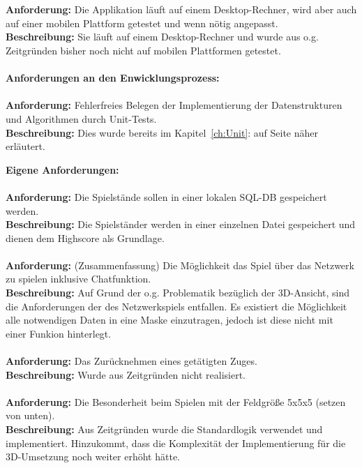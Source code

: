 \documentclass[a4paper]{scrartcl}
\begin{document}
\\
\\
\textbf{Anforderung:} Die Applikation läuft auf einem Desktop-Rechner, wird aber auch auf einer mobilen Plattform getestet und wenn nötig angepasst.
\\
\textbf{Beschreibung:}  Sie läuft auf einem Desktop-Rechner und wurde aus o.g. Zeitgründen bisher noch nicht auf mobilen Plattformen getestet. 
\\
\\
\textbf{Anforderungen an den Enwicklungsprozess:}
\\
\\
\textbf{Anforderung:} Fehlerfreies Belegen der Implementierung der Datenstrukturen und Algorithmen durch Unit-Tests. 
\\
\textbf{Beschreibung:} Dies wurde bereits im Kapitel~\ref{ch:Unit}: auf Seite \pageref{ch:Unit} näher erläutert.


\textbf{Eigene Anforderungen:}
\\
\\
\textbf{Anforderung:} Die Spielstände sollen in einer lokalen SQL-DB gespeichert werden.
\\
\textbf{Beschreibung:} Die Spielständer werden in einer einzelnen Datei gespeichert und dienen dem Highscore als Grundlage.
\\
\\
\textbf{Anforderung:} (Zusammenfassung) Die Möglichkeit das Spiel über das Netzwerk zu spielen inklusive Chatfunktion.
\\
\textbf{Beschreibung:} Auf Grund der o.g. Problematik bezüglich der 3D-Ansicht, sind die Anforderungen der des Netzwerkspiels entfallen. Es existiert die Möglichkeit alle notwendigen Daten in eine Maske einzutragen, jedoch ist diese nicht mit einer Funkion hinterlegt.
\\
\\
\textbf{Anforderung:} Das Zurücknehmen eines getätigten Zuges. 
\\
\textbf{Beschreibung:} Wurde aus Zeitgründen nicht realisiert.
\\
\\
\textbf{Anforderung:} Die Besonderheit beim Spielen mit der Feldgröße 5x5x5 (setzen von unten).
\\
\textbf{Beschreibung:} Aus Zeitgründen wurde die Standardlogik verwendet und implementiert. Hinzukommt, dass die Komplexität der Implementierung für die 3D-Umsetzung noch weiter erhöht hätte.
\end{document}
